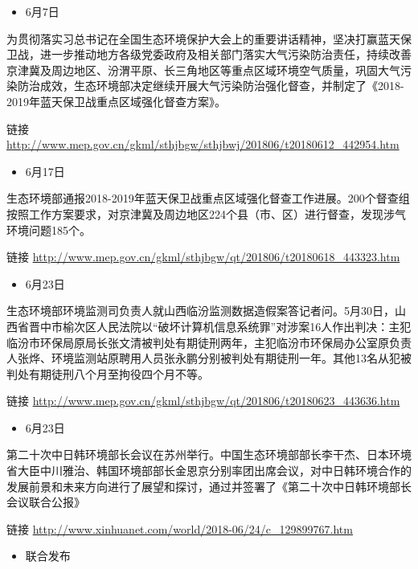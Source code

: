 \documentclass[]{book}
\providecommand{\tightlist}{%
  \setlength{\itemsep}{0pt}\setlength{\parskip}{0pt}}
\begin{document}
\begin{itemize}
\tightlist
\item
  6月7日
\end{itemize}

为贯彻落实习总书记在全国生态环境保护大会上的重要讲话精神，坚决打赢蓝天保卫战，进一步推动地方各级党委政府及相关部门落实大气污染防治责任，持续改善京津冀及周边地区、汾渭平原、长三角地区等重点区域环境空气质量，巩固大气污染防治成效，生态环境部决定继续开展大气污染防治强化督查，并制定了《2018-2019年蓝天保卫战重点区域强化督查方案》。

链接 \url{http://www.mep.gov.cn/gkml/sthjbgw/sthjbwj/201806/t20180612_442954.htm}

\begin{itemize}
\tightlist
\item
  6月17日
\end{itemize}

生态环境部通报2018-2019年蓝天保卫战重点区域强化督查工作进展。200个督查组按照工作方案要求，对京津冀及周边地区224个县（市、区）进行督查，发现涉气环境问题185个。

链接 \url{http://www.mep.gov.cn/gkml/sthjbgw/qt/201806/t20180618_443323.htm}

\begin{itemize}
\tightlist
\item
  6月23日
\end{itemize}

生态环境部环境监测司负责人就山西临汾监测数据造假案答记者问。5月30日，山西省晋中市榆次区人民法院以``破坏计算机信息系统罪''对涉案16人作出判决：主犯临汾市环保局原局长张文清被判处有期徒刑两年，主犯临汾市环保局办公室原负责人张烨、环境监测站原聘用人员张永鹏分别被判处有期徒刑一年。其他13名从犯被判处有期徒刑八个月至拘役四个月不等。

链接 \url{http://www.mep.gov.cn/gkml/sthjbgw/qt/201806/t20180623_443636.htm}

\begin{itemize}
\tightlist
\item
  6月23日
\end{itemize}

第二十次中日韩环境部长会议在苏州举行。中国生态环境部部长李干杰、日本环境省大臣中川雅治、韩国环境部部长金恩京分别率团出席会议，对中日韩环境合作的发展前景和未来方向进行了展望和探讨，通过并签署了《第二十次中日韩环境部长会议联合公报》

链接 \url{http://www.xinhuanet.com/world/2018-06/24/c_129899767.htm}

\begin{itemize}
\tightlist
\item
  联合发布
\end{itemize}
\end{document}
